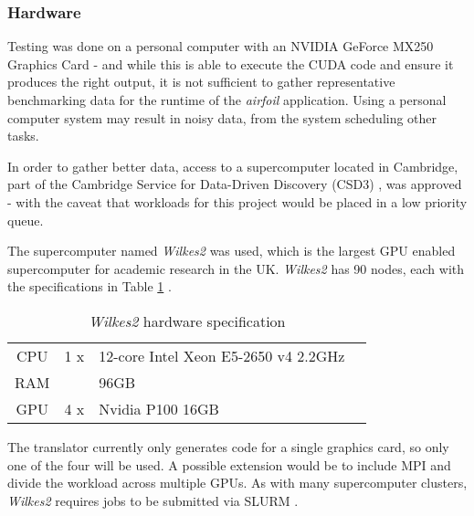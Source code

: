 \subsubsection{Hardware}
Testing was done on a personal computer with an NVIDIA GeForce MX250 Graphics Card \cite{mx250} - and while this is able to execute the CUDA code and ensure it produces the right output, it is not sufficient to gather representative benchmarking data for the runtime of the \textit{airfoil} application. Using a personal computer system may result in noisy data, from the system scheduling other tasks.
\par
In order to gather better data, access to a supercomputer located in Cambridge, part of the Cambridge Service for Data-Driven Discovery (CSD3) \cite{csd3}, was approved - with the caveat that workloads for this project would be placed in a low priority queue.
\par
The supercomputer named \textit{Wilkes2} was used, which is the largest GPU enabled supercomputer for academic research in the UK. \textit{Wilkes2} has 90 nodes, each with the specifications in Table \ref{tab:wilkes2} \cite{wilkes2}. \clearpage

\begin{table}[h]
  \centering
  \renewcommand{\arraystretch}{1.5}
  \caption{\textit{Wilkes2} hardware specification}
  \label{tab:wilkes2}
\begin{tabular}{c |r l c}
CPU & 1 x&12-core Intel Xeon E5-2650 v4 2.2GHz & \cite{xeon}\\
RAM & &96GB &\\
GPU & 4 x&Nvidia P100 16GB &\cite{p100}\\
\end{tabular}
\end{table}

The translator currently only generates code for a single graphics card, so only one of the four will be used. A possible extension would be to include MPI and divide the workload across multiple GPUs. As with many supercomputer clusters, \textit{Wilkes2} requires jobs to be submitted via SLURM \cite{slurm}.

